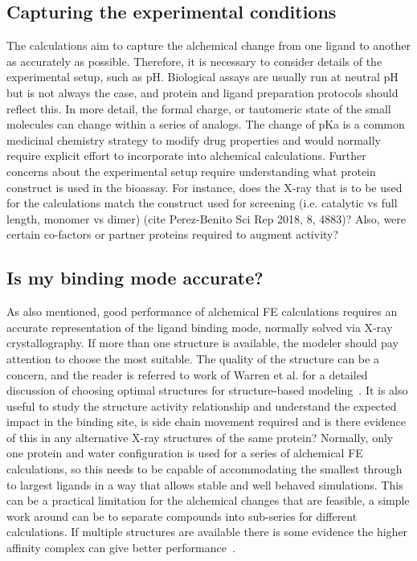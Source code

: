 \documentclass[9pt,bestpractices]{livecoms}
\begin{document}
\subsection*{Capturing the experimental conditions}
The calculations aim to capture the alchemical change from one ligand to another as accurately as possible. Therefore, it is necessary to consider details of the experimental setup, such as pH. Biological assays are usually run at neutral pH but is not always the case, and protein and ligand preparation protocols should reflect this. In more detail, the formal charge, or tautomeric state of the small molecules can change within a series of analogs. The change of pKa is a common medicinal chemistry strategy to modify drug properties and would normally require explicit effort to incorporate into alchemical calculations. Further concerns about the experimental setup require understanding what protein construct is used in the bioassay. For instance, does the X-ray that is to be used for the calculations match the construct used for screening (i.e. catalytic vs full length, monomer vs dimer) (cite Perez-Benito Sci Rep 2018, 8, 4883)? Also, were certain co-factors or partner proteins required to augment activity? 
%
\subsection*{Is my binding mode accurate?}
As also mentioned, good performance of alchemical FE calculations requires an accurate representation of the ligand binding mode, normally solved via X-ray crystallography. If more than one structure is available, the modeler should pay attention to choose the most suitable. The quality of the structure can be a concern, and the reader is referred to work of Warren et al. for a detailed discussion of choosing optimal structures for structure-based modeling~\cite{warren2012essential}. It is also useful to study the structure activity relationship and understand the expected impact in the binding site, is side chain movement required and is there evidence of this in any alternative X-ray structures of the same protein? Normally, only one protein and water configuration is used for a series of alchemical FE calculations, so this needs to be capable of accommodating the smallest through to largest ligands in a way that allows stable and well behaved simulations. This can be a practical limitation for the alchemical changes that are feasible, a simple work around can be to separate compounds into sub-series for different calculations. If multiple structures are available there is some evidence the higher affinity complex can give better performance~\cite{perez-benito2019predicting}.
%
\end{document}
